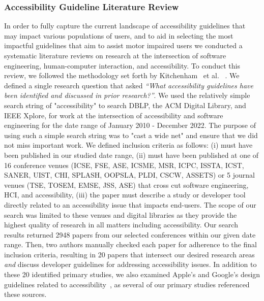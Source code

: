 \subsubsection{Accessibility Guideline Literature Review}

In order to fully capture the current landscape of accessibility guidelines that may impact various populations of users, and to aid in selecting the most impactful guidelines that aim to assist motor impaired users we conducted a systematic literature reviews on research at the intersection of software engineering, human-computer interaction, and accessibility. To conduct this review, we followed the methodology set forth by Kitchenham~ et al. ~\cite{kitchenham2007guidelines}. We defined a single research question that asked \textit{``What accessibility guidelines have been identified and discussed in prior research?''}. We used the relatively simple search string of "accessibility" to search DBLP, the ACM Digital Library, and IEEE Xplore, for work at the intersection of accessibility and software engineering for the date range of January 2010 - December 2022. The purpose of using such a simple search string was to "cast a wide net" and ensure that we did not miss important work. We defined inclusion criteria as follows: (i) must have been published in our studied date range, (ii) must have been published at one of 16 conference venues (ICSE, FSE, ASE, ICSME, MSR, ICPC, ISSTA, ICST, SANER, UIST, CHI, SPLASH, OOPSLA, PLDI, CSCW, ASSETS) or 5 journal venues (TSE, TOSEM, EMSE, JSS, ASE) that cross cut software engineering, HCI, and accessibility, (iii) the paper must describe a study or developer tool directly related to an accessibility issue that impacts end-users. The scope of our search was limited to these venues and digital libraries as they provide the highest quality of research in all matters including accessibility. Our search results returned 2948 papers from our selected conferences within our given date range. Then, two authors manually checked  each paper for adherence to the final inclusion criteria, resulting in 20 papers that intersect our desired research areas \textit{and} discuss developer guidelines for addressing accessibility issues. In addition to these 20 identified primary studies, we also examined Apple's and Google's design guidelines related to accessibility~\cite{AppleAccess,GoogleAccess}, as several of our primary studies referenced these sources.

